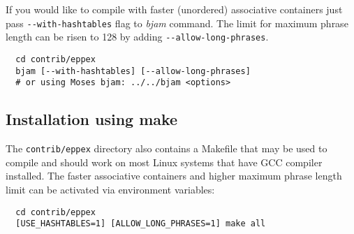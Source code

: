 If you would like to compile \eppex{} with faster (unordered) associative containers
just pass \verb|--with-hashtables| flag to \emph{bjam} command.
The limit for maximum phrase length can be risen to 128 by adding
\verb|--allow-long-phrases|.
\begin{verbatim}
  cd contrib/eppex
  bjam [--with-hashtables] [--allow-long-phrases]
  # or using Moses bjam: ../../bjam <options>
\end{verbatim}

\subsection*{Installation using make}
The \texttt{contrib/eppex} directory also contains a Makefile that may be used to compile
\eppex{} and should work on most Linux systems that have GCC compiler installed.
The faster associative containers and higher maximum phrase length limit can be activated
via environment variables:
\begin{verbatim}
  cd contrib/eppex
  [USE_HASHTABLES=1] [ALLOW_LONG_PHRASES=1] make all
\end{verbatim}
